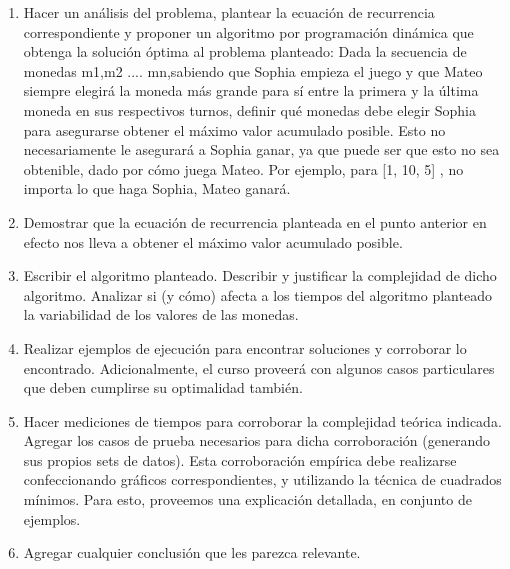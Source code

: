 \begin{enumerate}
    \item Hacer un análisis del problema, plantear la ecuación de recurrencia correspondiente y proponer un algoritmo por programación dinámica que obtenga la solución óptima al problema planteado: Dada la secuencia de monedas m1,m2 .... mn,sabiendo que Sophia empieza el juego y que Mateo siempre elegirá la moneda más grande para sí entre la primera y la última moneda en sus respectivos turnos, definir qué monedas debe elegir Sophia para asegurarse obtener el máximo valor acumulado posible. Esto no necesariamente le asegurará a Sophia ganar, ya que puede ser que esto no sea obtenible, dado por cómo juega Mateo. Por ejemplo, para [1, 10, 5] , no importa lo que haga Sophia, Mateo ganará.
    \vskip0.3cm
    \item Demostrar que la ecuación de recurrencia planteada en el punto anterior en efecto nos lleva a obtener el máximo valor acumulado posible.
    \vskip0.3cm
    \item Escribir el algoritmo planteado. Describir y justificar la complejidad de dicho algoritmo. Analizar si (y cómo) afecta a los tiempos del algoritmo planteado la variabilidad de los valores de las monedas.
    \vskip0.3cm
    \item Realizar ejemplos de ejecución para encontrar soluciones y corroborar lo encontrado. Adicionalmente, el curso proveerá con algunos casos particulares que deben cumplirse su optimalidad también.
    \vskip0.3cm
    \item Hacer mediciones de tiempos para corroborar la complejidad teórica indicada. Agregar los casos de prueba necesarios para dicha corroboración (generando sus propios sets de datos). Esta corroboración empírica debe realizarse confeccionando gráficos correspondientes, y utilizando la técnica de cuadrados mínimos. Para esto, proveemos una explicación detallada, en conjunto de ejemplos.
    \vskip0.3cm
    \item Agregar cualquier conclusión que les parezca relevante.
\end{enumerate}


